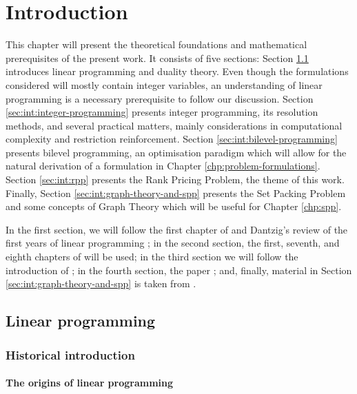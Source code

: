 \chapter{Introduction}
\label{chp:introduction}

\pagestyle{headings}

This chapter will present the theoretical foundations and mathematical
prerequisites of the present work. It consists of five sections: Section
\ref{sec:int:linear-programming} introduces linear programming and duality
theory. Even though the formulations considered will mostly contain integer
variables, an understanding of linear programming is a necessary prerequisite to
follow our discussion. Section \ref{sec:int:integer-programming} presents
integer programming, its resolution methods, and several practical matters,
mainly considerations in computational complexity and restriction reinforcement.
Section \ref{sec:int:bilevel-programming} presents bilevel programming, an
optimisation paradigm which will allow for the natural derivation of a
formulation in Chapter \ref{chp:problem-formulations}.  Section
\ref{sec:int:rpp} presents the Rank Pricing Problem, the theme of this work.
Finally, Section \ref{sec:int:graph-theory-and-spp} presents the Set Packing
Problem and some concepts of Graph Theory which will be useful for Chapter
\ref{chp:spp}.


In the first section, we will follow the first chapter of \cite{ba:linear} and
Dantzig's review of the first years of linear programming
\cite{da:reminiscences}; in the second section, the first, seventh, and eighth
chapters of \cite{wo:integer} will be used; in the third section we will follow
the introduction of \cite{de:foundations}; in the fourth section, the paper
\cite{ca:rpp}; and, finally, material in Section
\ref{sec:int:graph-theory-and-spp} is taken from \cite{pa:facial-structure}.

\section{Linear programming} %
\label{sec:int:linear-programming}

\subsection{Historical introduction} %
\label{ssc:int:lp:historical-introduction}

\subsubsection{The origins of linear programming} %


